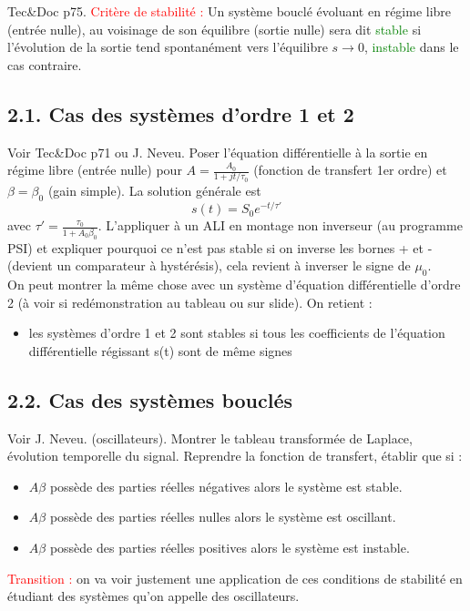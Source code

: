 \documentclass[french, a4paper, 10pt, twocolumn, landscape]{article}
\begin{document}
Tec\&Doc p75. \textcolor{red}{Critère de stabilité :} Un système bouclé évoluant en régime libre (entrée nulle), au voisinage de son équilibre (sortie nulle) sera dit \textcolor{green}{stable} si l'évolution de la sortie tend spontanément vers l'équilibre $s\rightarrow0$, \textcolor{green}{instable} dans le cas contraire.
\subsection*{2.1. Cas des systèmes d'ordre 1 et 2}
Voir Tec\&Doc p71 ou J. Neveu. Poser l'équation différentielle à la sortie en régime libre (entrée nulle) pour $A=\frac{A_0}{1+jt/\tau_0}$  (fonction de transfert 1er ordre) et $\beta=\beta_0$ (gain simple). La solution générale est 
\begin{equation}
    s(t) = S_0e^{-t/\tau'}
\end{equation}
avec $\tau'=\frac{\tau_0}{1+A_0\beta_0}$. L'appliquer à un ALI en montage non inverseur (au programme PSI) et expliquer pourquoi ce n'est pas stable si on inverse les bornes + et - (devient un comparateur à hystérésis), cela revient à inverser le signe de $\mu_0$.\\
On peut montrer la même chose avec un système d'équation différentielle d'ordre 2 (à voir si redémonstration au tableau ou sur slide). On retient :
\begin{itemize}
    \item les systèmes d'ordre 1 et 2 sont stables si tous les coefficients de l'équation différentielle régissant s(t) sont de même signes
\end{itemize}
\subsection*{2.2. Cas des systèmes bouclés}
Voir J. Neveu. (oscillateurs). Montrer le tableau transformée de Laplace, évolution temporelle du signal. Reprendre la fonction de transfert, établir que si :
\begin{itemize}
    \item $A\beta$ possède des parties réelles négatives alors le système est stable.
    \item $A\beta$ possède des parties réelles nulles alors le système est oscillant.
    \item $A\beta$ possède des parties réelles positives alors le système est instable.
\end{itemize}

\textcolor{red}{Transition :} on va voir justement une application de ces conditions de stabilité en étudiant des systèmes qu'on appelle des oscillateurs. 
\end{document}
